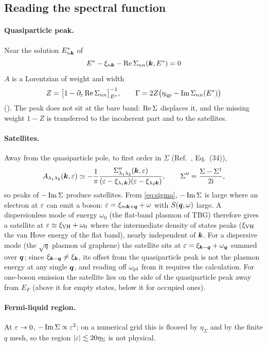 \subsection{Reading the spectral function}

\paragraph{Quasiparticle peak.} Near the solution $E^*_{n\bm k}$ of
\begin{equation}
E^*-\xi_{n\bm k}-\operatorname{Re}\Sigma_{nn}(\bm k,E^*)=0
\end{equation}
$A$ is a Lorentzian of weight and width
\begin{equation}
Z=\bigl[1-\partial_\varepsilon\operatorname{Re}\Sigma_{nn}\bigr]^{-1}_{E^*},\qquad \Gamma=2Z\bigl(\eta_{\rm qp}-\operatorname{Im}\Sigma_{nn}(E^*)\bigr)
\end{equation}
(). The peak does not sit at the bare band: $\operatorname{Re}\Sigma$ displaces it, and
the missing weight $1-Z$ is transferred to the incoherent part and to the satellites.

\paragraph{Satellites.} Away from the quasiparticle pole, to first order in $\Sigma$ (Ref.~\cite{Wei2025}, Eq.~(34)),
\begin{equation}
A_{\lambda_1\lambda_2}(\bm k,\varepsilon)\simeq-\frac1\pi\frac{\Sigma''_{\lambda_1\lambda_2}(\bm k,\varepsilon)}{(\varepsilon-\xi_{\lambda_1\bm k})(\varepsilon-\xi_{\lambda_2\bm k})},
\qquad \Sigma''=\frac{\Sigma-\Sigma^\dagger}{2\mathrm i},
\end{equation}
so peaks of $-\operatorname{Im}\Sigma$ produce satellites. From \cref{eq:sigma}, $-\operatorname{Im}\Sigma$ is large where an electron at
$\varepsilon$ can emit a boson: $\varepsilon=\xi_{m\bm k+\bm q}+\omega$ with $S(\bm q,\omega)$ large. A dispersionless mode of energy
$\omega_0$ (the flat-band plasmon of TBG) therefore gives a satellite at $\varepsilon\simeq\xi_{\rm VH}+\omega_0$ where the
intermediate density of states peaks ($\xi_{\rm VH}$ the van Hove energy of the flat band), nearly independent of
$\bm k$. For a dispersive mode (the $\sqrt q$ plasmon of graphene) the satellite sits at $\varepsilon=\xi_{\bm k-\bm q}+\omega_{\bm q}$
summed over $\bm q$; since $\xi_{\bm k-\bm q}\ne\xi_{\bm k}$, its offset from the quasiparticle peak is not the plasmon
energy at any single $\bm q$, and reading off $\omega_{\rm pl}$ from it requires the calculation. For one-boson
emission the satellite lies on the side of the quasiparticle peak away from $E_F$ (above it for empty states,
below it for occupied ones).

\paragraph{Fermi-liquid region.} At $\varepsilon\to0$, $-\operatorname{Im}\Sigma\propto\varepsilon^2$; on a numerical grid this is floored
by $\eta_\Sigma$ and by the finite $q$ mesh, so the region $|\varepsilon|\lesssim20\eta_\Sigma$ is not physical.
